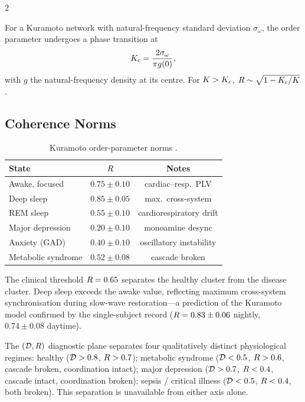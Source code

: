 \begin{multicols}{2}
\begin{theorem}
\label{thm:ch08-kc}
For a Kuramoto network with natural-frequency standard deviation $\sigma_\omega$, the order parameter undergoes a phase transition at
\begin{equation}
K_c = \frac{2\sigma_\omega}{\pi g(0)},
\label{eq:ch08-Kc}
\end{equation}
with $g$ the natural-frequency density at its centre. For $K > K_c$, $R \sim \sqrt{1 - K_c/K}$ \citep{kuramoto1984}.
\end{theorem}

\subsection{Coherence Norms}

\begin{table}[H]
\centering
\small
\begin{tabular}{lcc}
\toprule
\textbf{State} & $R$ & \textbf{Notes} \\
\midrule
Awake, focused & $0.75 \pm 0.10$ & cardiac--resp.\ PLV \\
Deep sleep & $0.85 \pm 0.05$ & max.\ cross-system \\
REM sleep & $0.55 \pm 0.10$ & cardiorespiratory drift \\
Major depression & $0.20 \pm 0.10$ & monoamine desync \\
Anxiety (GAD) & $0.40 \pm 0.10$ & oscillatory instability \\
Metabolic syndrome & $0.52 \pm 0.08$ & cascade broken \\
\bottomrule
\end{tabular}
\caption{Kuramoto order-parameter norms \citep{strogatz2000, acebron2005, glass2001}.}
\label{tab:ch08-R-norms}
\end{table}

The clinical threshold $R = 0.65$ separates the healthy cluster from the disease cluster. Deep sleep exceeds the awake value, reflecting maximum cross-system synchronisation during slow-wave restoration---a prediction of the Kuramoto model confirmed by the single-subject record ($R = 0.83 \pm 0.06$ nightly, $0.74 \pm 0.08$ daytime).

The $(\mathcal{D}, R)$ diagnostic plane separates four qualitatively distinct physiological regimes: healthy ($\mathcal{D} > 0.8$, $R > 0.7$); metabolic syndrome ($\mathcal{D} < 0.5$, $R > 0.6$, cascade broken, coordination intact); major depression ($\mathcal{D} > 0.7$, $R < 0.4$, cascade intact, coordination broken); sepsis / critical illness ($\mathcal{D} < 0.5$, $R < 0.4$, both broken). This separation is unavailable from either axis alone.


\end{multicols}

